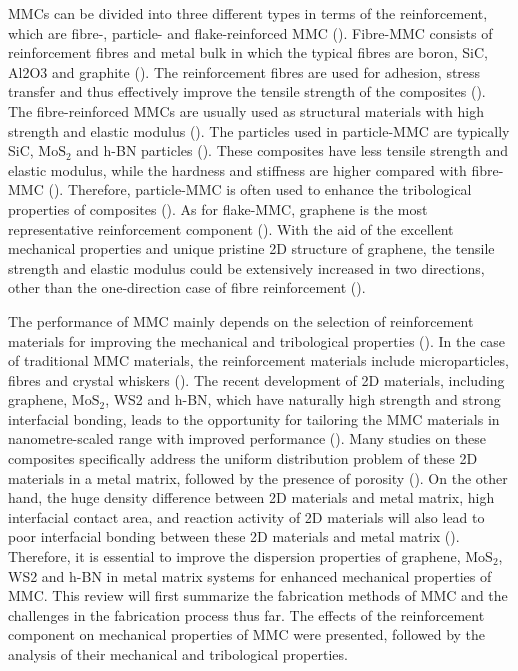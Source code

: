 MMCs can be divided into three different types in terms of the reinforcement, which are fibre-, particle- and flake-reinforced MMC (\cite {clynetw1993anintroductiontometalmatrixcomposites, ibrahim1991particulate, chawla2012metal}). Fibre-MMC consists of reinforcement fibres and metal bulk in which the typical fibres are boron, SiC, Al2O3 and graphite (\cite {chou1985fibre}). The reinforcement fibres are used for adhesion, stress transfer and thus effectively improve the tensile strength of the composites (\cite{shirvanimoghaddam2017carbon}). The fibre-reinforced MMCs are usually used as structural materials with high strength and elastic modulus (\cite {vijayaram2006fabrication}). The particles used in particle-MMC are typically SiC, $ \text{MoS}_{2} $ and h-BN particles (\cite {chawla2001mechanical}). These composites have less tensile strength and elastic modulus, while the hardness and stiffness are higher compared with fibre-MMC (\cite {zhang1995wear}). Therefore, particle-MMC is often used to enhance the tribological properties of composites (\cite {chawla2001mechanical}). As for flake-MMC, graphene is the most representative reinforcement component (\cite {wang2012reinforcement}). With the aid of the excellent mechanical properties and unique pristine 2D structure of graphene, the tensile strength and elastic modulus could be extensively increased in two directions, other than the one-direction case of fibre reinforcement (\cite {kumar2014graphene}).

The performance of MMC mainly depends on the selection of reinforcement materials for improving the mechanical and tribological properties (\cite {hg2017tribological}). In the case of traditional MMC materials, the reinforcement materials include microparticles, fibres and crystal whiskers (\cite {chawla2001mechanical}). The recent development of 2D materials, including graphene, $ \text{MoS}_{2} $, WS2 and h-BN, which have naturally high strength and strong interfacial bonding, leads to the opportunity for tailoring the MMC materials in nanometre-scaled range with improved performance (\cite {hg2017tribological, kasar2018graphene, nieto2017graphene, nautiyal2019copper, xiao2017tribological}). Many studies on these composites specifically address the uniform distribution problem of these 2D materials in a metal matrix, followed by the presence of porosity (\cite {hg2017tribological, kasar2018graphene}). On the other hand, the huge density difference between 2D materials and metal matrix, high interfacial contact area, and reaction activity of 2D materials will also lead to poor interfacial bonding between these 2D materials and metal matrix (\cite {kasar2018graphene, takeda2017cu}). Therefore, it is essential to improve the dispersion properties of graphene, $ \text{MoS}_{2} $, WS2 and h-BN in metal matrix systems for enhanced mechanical properties of MMC. This review will first summarize the fabrication methods of MMC and the challenges in the fabrication process thus far. The effects of the reinforcement component on mechanical properties of MMC were presented, followed by the analysis of their mechanical and tribological properties.

